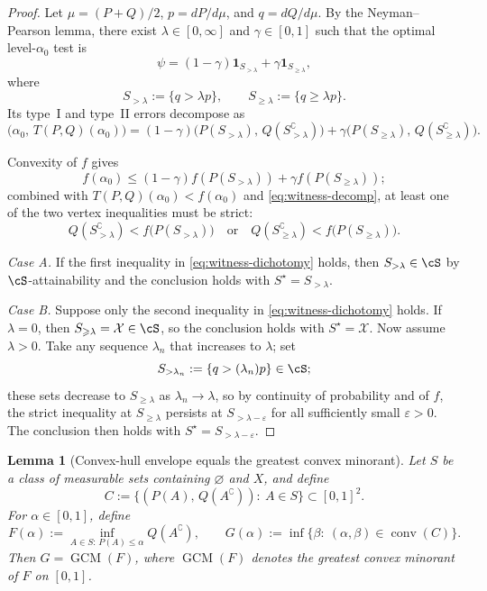 \documentclass[english]{article}
\theoremstyle{plain}
\newtheorem{lemma}{Lemma}[section]
\theoremstyle{definition}
\newcommand{\Toff}[2]{T(#1,#2)}
\begin{document}
\begin{proof}
Let $\mu=(P+Q)/2$, $p=dP/d\mu$, and $q=dQ/d\mu$.
By the Neyman--Pearson lemma, there exist $\lambda \in [0, \infty]$ and $\gamma\in[0,1]$ such that the optimal level-$\alpha_0$ test is
\[
\psi=(1-\gamma)\mathbf 1_{S_{>\lambda}}+\gamma \mathbf 1_{S_{\geqslant \lambda}},
\]
where
\[
S_{>\lambda}:=\{q>\lambda p\},
\qquad
S_{\geqslant\lambda}:=\{q\geqslant\lambda p\}.
\]
Its type~I and type~II errors decompose as
\begin{equation}\label{eq:witness-decomp}
\bigl(\alpha_0,\,\Toff{P}{Q}(\alpha_0)\bigr)
=
(1-\gamma)\bigl(P(S_{>\lambda}),\,Q(S_{>\lambda}^\complement)\bigr)
+
\gamma\bigl(P(S_{\geqslant\lambda}),\,Q(S_{\geqslant\lambda}^\complement)\bigr).
\end{equation}

Convexity of $f$ gives
\[
f(\alpha_0)\leqslant (1-\gamma)f(P(S_{>\lambda}))+\gamma f(P(S_{\geqslant\lambda}));
\]
combined with $\Toff{P}{Q}(\alpha_0)<f(\alpha_0)$ and \eqref{eq:witness-decomp}, at least one of the two vertex inequalities must be strict:
\begin{equation}\label{eq:witness-dichotomy}
Q(S_{>\lambda}^\complement)<f\bigl(P(S_{>\lambda})\bigr)
\quad\text{or}\quad
Q(S_{\geqslant\lambda}^\complement)<f\bigl(P(S_{\geqslant\lambda})\bigr).
\end{equation}

\emph{Case A.} If the first inequality in \eqref{eq:witness-dichotomy} holds, then $S_{>\lambda}\in\cS$ by $\cS$-attainability and the conclusion holds with $S^\star=S_{>\lambda}$.

\emph{Case B.} Suppose only the second inequality in \eqref{eq:witness-dichotomy} holds.
If $\lambda=0$, then $S_{\geqslant\lambda}=\mathcal X\in\cS$, so the conclusion holds with $S^\star=\mathcal X$.
Now assume $\lambda>0$. Take any sequence $\lambda_n$ that increases to $\lambda$; set
\[
S_{>\lambda_n}:=\{q>(\lambda_n)p\}\in\cS;
\]
these sets decrease to $S_{\geqslant\lambda}$ as $\lambda_n \to \lambda$, so by continuity of probability and of $f$, the strict inequality at $S_{\geqslant\lambda}$ persists at $S_{>\lambda-\varepsilon}$ for all sufficiently small $\varepsilon>0$. The conclusion then holds with $S^\star=S_{>\lambda-\varepsilon}$.
\end{proof}


\begin{lemma}[Convex-hull envelope equals the greatest convex minorant]
\label{lem:convex-hull-gcm}
Let $S$ be a class of measurable sets containing $\varnothing$ and $X$, and define
\[
C:=\{(P(A),\,Q(A^{\complement})):\ A\in S\}\subset [0,1]^2.
\]
For $\alpha\in[0,1]$, define
\[
F(\alpha):=\inf_{A\in S:\,P(A)\leqslant \alpha} Q(A^{\complement}),
\qquad
G(\alpha):=\inf\{\beta:\ (\alpha,\beta)\in \operatorname{conv}(C)\}.
\]
Then $G=\operatorname{GCM}(F)$, 
where $\operatorname{GCM}(F)$ denotes the greatest convex minorant of $F$ on $[0,1]$.
\end{lemma}
\end{document}
